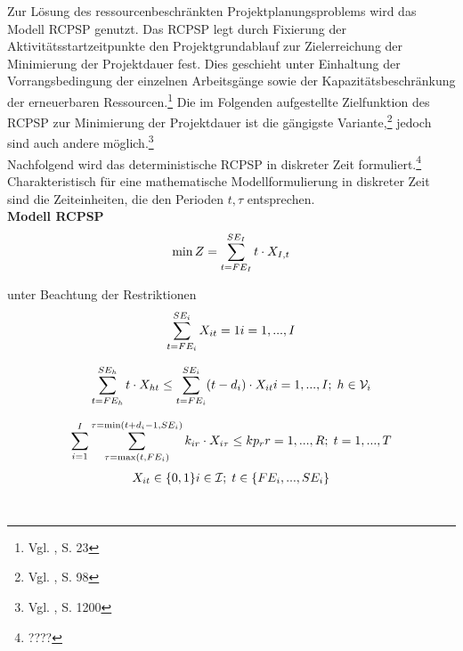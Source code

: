 \documentclass[a4paper,12pt,parskip,bibtotoc,liststotoc]{article}
\begin{document}
Zur Lösung des ressourcenbeschränkten Projektplanungsproblems wird das Modell RCPSP genutzt. Das RCPSP legt durch Fixierung der Aktivitätsstartzeitpunkte den Projektgrundablauf zur Zielerreichung der Minimierung der Projektdauer fest. Dies geschieht unter Einhaltung der Vorrangsbedingung der einzelnen Arbeitsgänge sowie der Kapazitätsbeschränkung der erneuerbaren Ressourcen.\footnote{Vgl. \cite{demeulemeester2011robust}, S. 23} Die im Folgenden aufgestellte Zielfunktion des RCPSP zur Minimierung der Projektdauer ist die gängigste Variante,\footnote{Vgl. \cite{drexl1997neuere}, S. 98} jedoch sind auch andere möglich.\footnote{Vgl. \cite{talbot1982resource}, S. 1200}\\

Nachfolgend wird das deterministische RCPSP in diskreter Zeit formuliert.\footnote{????} Charakteristisch für eine mathematische Modellformulierung in diskreter Zeit sind die Zeiteinheiten, die den Perioden $t, \tau$ entsprechen.\\

\textbf{Modell RCPSP}
\begin{eqnarray} \label{Ziel}
\min Z = \sum_{t=FE_{I}}^{SE_{I}}t \cdot X_{I,t}\hfill  
\end{eqnarray}

unter Beachtung der Restriktionen
\begin{multline} \label{N1}
\sum_{t=FE_{i}}^{SE_{i}} X_{it} = 1
\hfill   i = 1,...,I
\end{multline}\vspace{-3.0ex}

\begin{multline} \label{N2}
\sum_{t=FE_{h}}^{SE_{h}}t \cdot X_{ht} \leq \sum_{t=FE_{i}}^{SE_{i}}(t - d_{i}) \cdot X_{it}
\hfill   i =1,...,I;\; h \in \mathcal{V}_{i}
\end{multline}\vspace{-3.0ex}

\begin{multline} \label{N3}
\sum_{i=1}^{I}\sum_{\tau=\max(t,FE_{i})}^{\tau=\min(t+d_i-1,SE_i)}k_ {ir} \cdot X_{i\tau} \leq kp_{r}
\hfill   r =1,...,R;\; t=1,...,T
\end{multline}\vspace{-3.0ex}
\begin{multline} \label{N4}
X_{it} \in \{0,1\}
\hfill   i \in \mathcal{I};\; t \in \{FE_{i},...,SE_{i}\}\end{multline}\vspace{-6.0ex}\\
\end{document}
